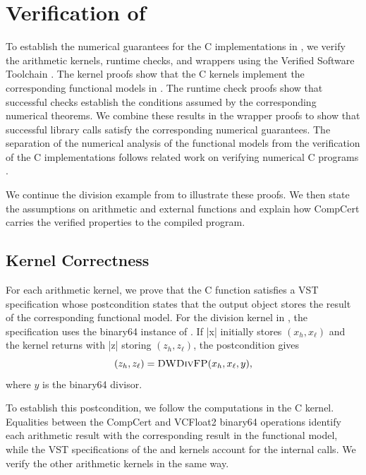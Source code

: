 \section{Verification of \FenceDD}
\label{sec:mechanization}

To establish the numerical guarantees for the C implementations in
\FenceDD{}, we verify the arithmetic kernels, runtime checks, and
wrappers using the Verified Software Toolchain \citep{Cao2018VSTFloyd}.
The kernel proofs show that the C kernels implement the
corresponding functional models in .
The runtime check proofs show that successful checks establish
the conditions assumed by the corresponding numerical theorems.
We combine these results in the wrapper proofs to show that
successful library calls satisfy the corresponding numerical
guarantees. The separation of the numerical analysis of the 
functional models from the verification of the C implementations
follows related work on verifying numerical C programs
\citep{AppelBertot2020,Kellison2023LAProof,Tekriwal2023Jacobi}.

We continue the division example from
 to illustrate
these proofs. We then state the assumptions on arithmetic and
external functions and explain how CompCert carries the verified
properties to the compiled program.

\subsection{Kernel Correctness}
\label{sec:kernel-refinement}

For each arithmetic kernel, we prove that the C function satisfies
a VST specification whose postcondition states that the output
object stores the result of the corresponding functional model.
For the division kernel in , the
specification uses the binary64 instance of \DWDivFP{}. If
\ccode|x| initially stores $(x_h,x_\ell)$ and the kernel returns
with \ccode|z| storing $(z_h,z_\ell)$, the postcondition gives
\begin{equation}
  (z_h,z_\ell)=\textsc{DWDivFP}(x_h,x_\ell,y),
  \label{eq:dw-div-fp-kernel-refinement}
\end{equation}
where $y$ is the binary64 divisor.

To establish this postcondition, we follow the computations in
the C kernel. Equalities between the CompCert and VCFloat2
binary64 operations identify each arithmetic result with the
corresponding result in the functional model, while the VST
specifications of the \FastTwoMult{} and \FastTwoSum{} kernels
account for the internal calls. We verify the other arithmetic
kernels in the same way.

